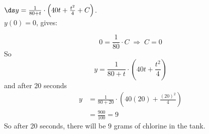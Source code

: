 \begin{frame}

$\ds 
y=\frac{1}{80+t}\cdot\left(40t+\frac{t^2}{4}+C\right)
$. \\ 
$y(0)=0$, gives:                                     

\[
0=\frac{1}{80}\cdot C\;\Rightarrow\; C=0
\]      
\pause So
\[
 y=\frac{1}{80+t}\cdot\left(40t+\frac{t^2}{4}\right)
\]                                     
\pause 
 and after 20 seconds 
\begin{align*}
y& =\frac{1}{80+20}\cdot\left(40(20)+\frac{(20)^2}{4}\right)\\
&=\frac{900}{100}=9
\end{align*} 
\pause                                        
So after 20 seconds, there will be $9$ grams of chlorine in the tank.    

\end{frame}

